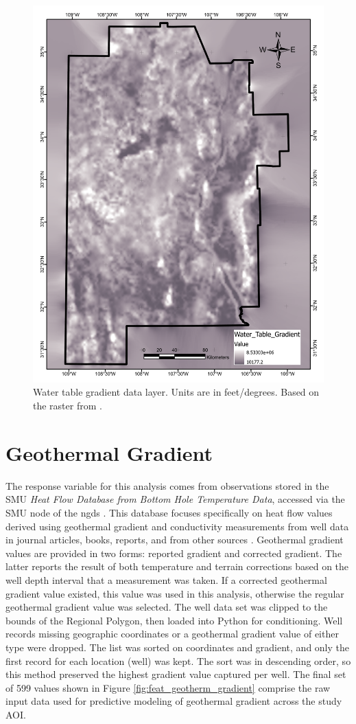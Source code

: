 \begin{figure}[H]
\centering
\includegraphics[width=0.75\linewidth]{templates/images/Figure-WTGradient.pdf}
\caption[Water table gradient data layer]{Water table gradient data layer. Units are in feet/degrees. Based on the raster from \protect\citet{bielicki_hydrogeolgic_2015}.}
\label{fig:feat_wt_gradient}
\end{figure}
\pagebreak

\section{Geothermal Gradient}\label{app:dl_geothermal_gradient}
The response variable for this analysis comes from observations stored in the SMU \textit{Heat Flow Database from Bottom Hole Temperature Data}, accessed via the SMU node of the \acrlong{ngds} \citep{smu_geothermal_2021}. This database focuses specifically on heat flow values derived using geothermal gradient and conductivity measurements from well data in journal articles, books, reports, and from other sources \citep{blackwell_geothermal_2014}. Geothermal gradient values are provided in two forms: reported gradient and corrected gradient. The latter reports the result of both temperature and terrain corrections based on the well depth interval that a measurement was taken. If a corrected geothermal gradient value existed, this value was used in this analysis, otherwise the regular geothermal gradient value was selected. The well data set was clipped to the bounds of the Regional Polygon, then loaded into Python for conditioning. Well records missing geographic coordinates or a geothermal gradient value of either type were dropped. The list was sorted on coordinates and gradient, and only the first record for each location (well) was kept. The sort was in descending order, so this method preserved the highest gradient value captured per well. The final set of 599 values shown in Figure \ref{fig:feat_geotherm_gradient} comprise the raw input data used for predictive modeling of geothermal gradient across the study AOI.
\vfill
\pagebreak

